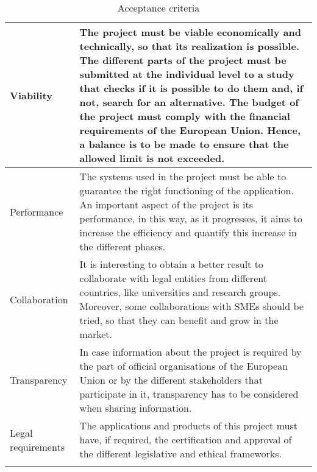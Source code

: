 \begin{longtable}[H]{lp{10.2cm}}
	Viability & The project must be viable economically and technically, so that its realization is possible. \newline
	The different parts of the project must be submitted at the individual level to a study that checks if it is possible to do them and, if not, search for an alternative. \newline
	The budget of the project must comply with the financial requirements of the European Union. Hence, a balance is to be made to ensure that the allowed limit is not exceeded. \vspace{0.2cm}
	\\ \midrule
	
	Performance & The systems used in the project must be able to guarantee the right functioning of the application. An important aspect of the project is its performance, in this way, as it progresses, it aims to increase the efficiency and quantify this increase in the different phases. \vspace{0.2cm}
	\\ \midrule
	
	Collaboration & It is interesting to obtain a better result to collaborate with legal entities from different countries, like universities and research groups. Moreover, some collaborations with SMEs should be tried, so that they can benefit and grow in the market. \vspace{0.2cm}	
	\\ \midrule
	
	Transparency & In case information about the project is required by the part of official organisations of the European Union or by the different stakeholders that participate in it, transparency has to be considered when sharing information. \vspace{0.2cm}
	\\ \midrule


	Legal requirements & The applications and products of this project must have, if required, the certification and approval of the different legislative and ethical frameworks. \vspace{0.2cm}
	\\ \bottomrule[2pt]
	
	\caption{Acceptance criteria}

\end{longtable}


